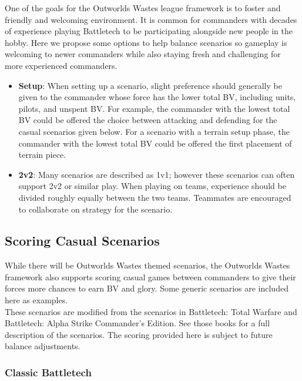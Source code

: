 \documentclass[UTF8]{article}
\begin{document}
One of the goals for the Outworlds Wastes league framework is to foster and friendly and welcoming environment.
It is common for commanders with decades of experience playing Battletech to be participating alongside new people in the hobby.
Here we propose some options to help balance scenarios so gameplay is welcoming to newer commanders while also staying fresh and challenging for more experienced commanders.\\

\begin{itemize}

\item {\bf Setup}: When setting up a scenario, slight preference should generally be given to the commander whose force has the lower total BV, including units, pilots, and unspent BV.
For example, the commander with the lowest total BV could be offered the choice between attacking and defending for the casual scenarios given below.
For a scenario with a terrain setup phase, the commander with the lowest total BV could be offered the first placement of terrain piece.

\item {\bf 2v2}: Many scenarios are described as 1v1; however these scenarios can often support 2v2 or similar play.
When playing on teams, experience should be divided roughly equally between the two teams.
Teammates are encouraged to collaborate on strategy for the scenario.

\end{itemize}

\subsection{Scoring Casual Scenarios}

While there will be Outworlds Wastes themed scenarios, the Outworlds Wastes framework also supports scoring casual games between commanders to give their forces more chances to earn BV and glory.
Some generic scenarios are included here as examples.\\

These scenarios are modified from the scenarios in Battletech: Total Warfare and Battletech: Alpha Strike Commander's Edition.
See those books for a full description of the scenarios.
The scoring provided here is subject to future balance adjustments.\\

\subsubsection{Classic Battletech}
\end{document}

